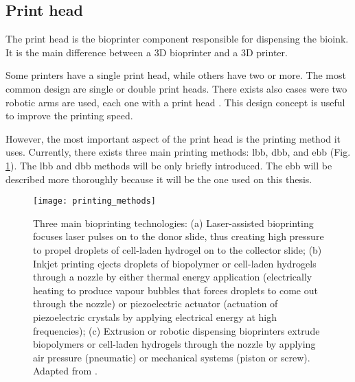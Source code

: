 
\subsection{Print head}
\label{subsec:print_head}

The print head is the bioprinter component responsible for dispensing the bioink. It is the main difference between a 3D bioprinter and a 3D printer.

Some printers have a single print head, while others have two or more. The most common design are single or double print heads. There exists also cases were two robotic arms are used, each one with a print head \cite{Ozbolat2014_multi_arm_bioprinter}. This design concept is useful to improve the printing speed.

However, the most important aspect of the print head is the printing method it uses. Currently, there exists three main printing methods: \gls{lbb}, \gls{dbb}, and \gls{ebb} (Fig. \ref{fig:printing_methods}). The \gls{lbb} and \gls{dbb} methods will be only briefly introduced. The \gls{ebb} will be described more thoroughly because it will be the one used on this thesis.

\begin{figure}[htbp]
	\centering
	\begin{adjustbox}{width=1.2\textwidth,center=\textwidth}
	\texttt{[image: printing\_methods]}
	\end{adjustbox}
	\caption[Three main bioprinting technologies.]{Three main bioprinting technologies: (a) Laser-assisted bioprinting focuses laser pulses on to the donor slide, thus creating high pressure to propel droplets of cell-laden hydrogel on to the collector slide; (b) Inkjet printing ejects droplets of biopolymer or cell-laden hydrogels through a nozzle by either thermal energy application (electrically heating to produce vapour bubbles that forces droplets to come out through the nozzle) or piezoelectric actuator (actuation of piezoelectric crystals by applying electrical energy at high frequencies); (c) Extrusion or robotic dispensing bioprinters extrude biopolymers or cell-laden hydrogels through the nozzle by applying air pressure (pneumatic) or mechanical systems (piston or screw). Adapted from \cite{Vijayavenkataraman2016_stateart_modelling_materials_processing}.}
	\label{fig:printing_methods}
\end{figure}


